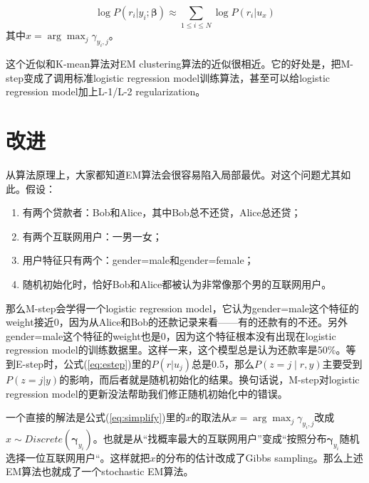 \documentclass[12pt,a4paper]{article}
\newcommand{\V}{\boldsymbol}
\begin{document}
\begin{equation}
\label{eq:simplify}
\log P(r_i|y_i; \V\beta) 
\approx \sum_{1\leq i\leq N} \log P(r_i|u_x) 
\end{equation}
%
其中$x=\arg\max_j \gamma_{y_i,j}$。

这个近似和K-mean算法对EM clustering算法的近似很相近。它的好处是，把M-step变成了调用标准logistic regression model训练算法，甚至可以给logistic regression model加上L-1/L-2 regularization。

\section{改进}

从算法原理上，大家都知道EM算法会很容易陷入局部最优。对这个问题尤其如此。假设：
%
\begin{enumerate}
\item 有两个贷款者：Bob和Alice，其中Bob总不还贷，Alice总还贷；
\item 有两个互联网用户：一男一女；
\item 用户特征只有两个：gender=male和gender=female；
\item 随机初始化时，恰好Bob和Alice都被认为非常像那个男的互联网用户。
\end{enumerate}

那么M-step会学得一个logistic regression model，它认为gender=male这个特征的weight接近0，因为从Alice和Bob的还款记录来看——有的还款有的不还。另外gender=male这个特征的weight也是0，因为这个特征根本没有出现在logistic regression model的训练数据里。这样一来，这个模型总是认为还款率是50\%。等到E-step时，公式(\ref{eq:estep})里的$P(r|u_j)$总是0.5，那么$P(z=j\mid r,y)$主要受到$P(z=j|y)$的影响，而后者就是随机初始化的结果。换句话说，M-step对logistic regression model的更新没法帮助我们修正随机初始化中的错误。

一个直接的解法是公式(\ref{eq:simplify})里的$x$的取法从$x=\arg\max_j\gamma_{y_i,j}$改成$x\sim Discrete(\V\gamma_{y_i})$。也就是从“找概率最大的互联网用户”变成“按照分布$\V\gamma_{y_i}$随机选择一位互联网用户“。这样就把$x$的分布的估计改成了Gibbs sampling。那么上述EM算法也就成了一个stochastic EM算法。
\end{document}

